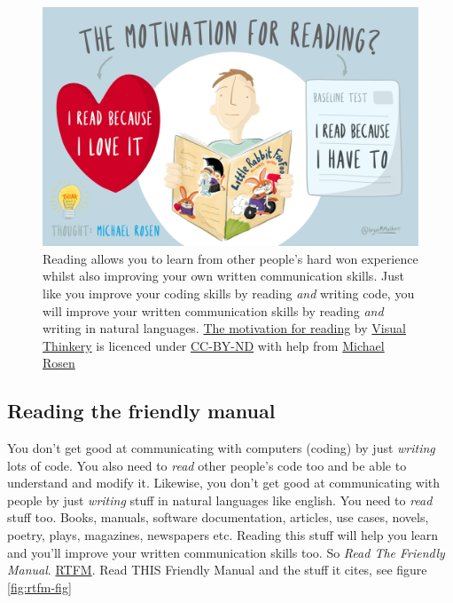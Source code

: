 \documentclass[
]{book}
\begin{document}
\begin{figure}

{\centering \includegraphics[width=1\linewidth]{images/the-motivation-for-reading} 

}

\caption{Reading allows you to learn from other people's hard won experience whilst also improving your own written communication skills. Just like you improve your coding skills by reading \emph{and} writing code, you will improve your written communication skills by reading \emph{and} writing in natural languages. \href{https://bryanmmathers.com/the-motivation-for-reading/}{The motivation for reading} by \href{https://visualthinkery.com/}{Visual Thinkery} is licenced under \href{https://creativecommons.org/licenses/by-nd/4.0/}{CC-BY-ND} with help from \href{https://en.wikipedia.org/wiki/Michael_Rosen}{Michael Rosen}}\label{fig:reading-fig}
\end{figure}



\hypertarget{rtfm}{%
\subsection{Reading the friendly manual}\label{rtfm}}

You don't get good at communicating with computers (coding) by just \emph{writing} lots of code. You also need to \emph{read} other people's code too and be able to understand and modify it. Likewise, you don't get good at communicating with people by just \emph{writing} stuff in natural languages like english. You need to \emph{read} stuff too. Books, manuals, software documentation, articles, use cases, novels, poetry, plays, magazines, newspapers etc. Reading this stuff will help you learn and you'll improve your written communication skills too. So \emph{Read The Friendly Manual}. \href{https://en.wikipedia.org/wiki/RTFM}{RTFM}. Read THIS Friendly Manual and the stuff it cites, see figure \ref{fig:rtfm-fig}
\end{document}
